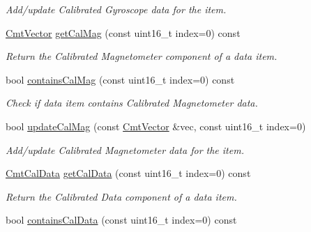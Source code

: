 \begin{DoxyCompactItemize}
\begin{DoxyCompactList}\small\item\em \-Add/update \-Calibrated \-Gyroscope data for the item. \end{DoxyCompactList}\item 
\hyperlink{structCmtVector}{\-Cmt\-Vector} \hyperlink{classxsens_1_1Packet_aba12c25efca22e42aba270ce31d46f10}{get\-Cal\-Mag} (const uint16\-\_\-t index=0) const 
\begin{DoxyCompactList}\small\item\em \-Return the \-Calibrated \-Magnetometer component of a data item. \end{DoxyCompactList}\item 
\hypertarget{classxsens_1_1Packet_a0ca9f112d7177be3d675f03e2d330c4c}{bool \hyperlink{classxsens_1_1Packet_a0ca9f112d7177be3d675f03e2d330c4c}{contains\-Cal\-Mag} (const uint16\-\_\-t index=0) const }\label{classxsens_1_1Packet_a0ca9f112d7177be3d675f03e2d330c4c}

\begin{DoxyCompactList}\small\item\em \-Check if data item contains \-Calibrated \-Magnetometer data. \end{DoxyCompactList}\item 
\hypertarget{classxsens_1_1Packet_a9741c38c612fa828eebe3ec70c9709a1}{bool \hyperlink{classxsens_1_1Packet_a9741c38c612fa828eebe3ec70c9709a1}{update\-Cal\-Mag} (const \hyperlink{structCmtVector}{\-Cmt\-Vector} \&vec, const uint16\-\_\-t index=0)}\label{classxsens_1_1Packet_a9741c38c612fa828eebe3ec70c9709a1}

\begin{DoxyCompactList}\small\item\em \-Add/update \-Calibrated \-Magnetometer data for the item. \end{DoxyCompactList}\item 
\hyperlink{structCmtCalData}{\-Cmt\-Cal\-Data} \hyperlink{classxsens_1_1Packet_afdfc30e76d6e40980ed42b8e19dd4e6b}{get\-Cal\-Data} (const uint16\-\_\-t index=0) const 
\begin{DoxyCompactList}\small\item\em \-Return the \-Calibrated \-Data component of a data item. \end{DoxyCompactList}\item 
\hypertarget{classxsens_1_1Packet_a7b7c4f5472b8296202b3c6fd4ff07071}{bool \hyperlink{classxsens_1_1Packet_a7b7c4f5472b8296202b3c6fd4ff07071}{contains\-Cal\-Data} (const uint16\-\_\-t index=0) const }\label{classxsens_1_1Packet_a7b7c4f5472b8296202b3c6fd4ff07071}


\end{DoxyCompactItemize}
